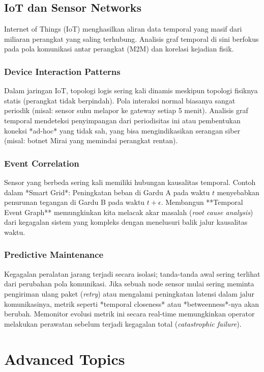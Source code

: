 \documentclass[12pt,a4paper]{book}
\begin{document}
\chapter{IoT dan Sensor Networks}
Internet of Things (IoT) menghasilkan aliran data temporal yang masif dari miliaran perangkat yang saling terhubung. Analisis graf temporal di sini berfokus pada pola komunikasi antar perangkat (M2M) dan korelasi kejadian fisik.

\section{Device Interaction Patterns}
Dalam jaringan IoT, topologi logis sering kali dinamis meskipun topologi fisiknya statis (perangkat tidak berpindah).
Pola interaksi normal biasanya sangat periodik (misal: sensor suhu melapor ke gateway setiap 5 menit). Analisis graf temporal mendeteksi penyimpangan dari periodisitas ini atau pembentukan koneksi *ad-hoc* yang tidak sah, yang bisa mengindikasikan serangan siber (misal: botnet Mirai yang memindai perangkat rentan).

\section{Event Correlation}
Sensor yang berbeda sering kali memiliki hubungan kausalitas temporal.
Contoh dalam *Smart Grid*: Peningkatan beban di Gardu A pada waktu $t$ menyebabkan penurunan tegangan di Gardu B pada waktu $t + \epsilon$.
Membangun **Temporal Event Graph** memungkinkan kita melacak akar masalah (\textit{root cause analysis}) dari kegagalan sistem yang kompleks dengan menelusuri balik jalur kausalitas waktu.

\section{Predictive Maintenance}
Kegagalan peralatan jarang terjadi secara isolasi; tanda-tanda awal sering terlihat dari perubahan pola komunikasi.
Jika sebuah node sensor mulai sering meminta pengiriman ulang paket (\textit{retry}) atau mengalami peningkatan latensi dalam jalur komunikasinya, metrik seperti *temporal closeness* atau *betweenness*-nya akan berubah. Memonitor evolusi metrik ini secara real-time memungkinkan operator melakukan perawatan sebelum terjadi kegagalan total (\textit{catastrophic failure}).

\part{Advanced Topics}
\end{document}
